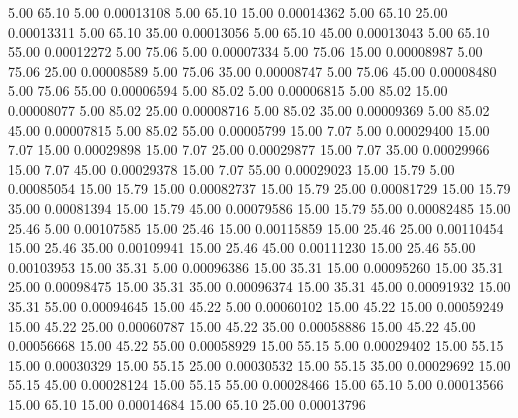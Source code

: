       5.00     65.10      5.00     0.00013108
      5.00     65.10     15.00     0.00014362
      5.00     65.10     25.00     0.00013311
      5.00     65.10     35.00     0.00013056
      5.00     65.10     45.00     0.00013043
      5.00     65.10     55.00     0.00012272
      5.00     75.06      5.00     0.00007334
      5.00     75.06     15.00     0.00008987
      5.00     75.06     25.00     0.00008589
      5.00     75.06     35.00     0.00008747
      5.00     75.06     45.00     0.00008480
      5.00     75.06     55.00     0.00006594
      5.00     85.02      5.00     0.00006815
      5.00     85.02     15.00     0.00008077
      5.00     85.02     25.00     0.00008716
      5.00     85.02     35.00     0.00009369
      5.00     85.02     45.00     0.00007815
      5.00     85.02     55.00     0.00005799
     15.00      7.07      5.00     0.00029400
     15.00      7.07     15.00     0.00029898
     15.00      7.07     25.00     0.00029877
     15.00      7.07     35.00     0.00029966
     15.00      7.07     45.00     0.00029378
     15.00      7.07     55.00     0.00029023
     15.00     15.79      5.00     0.00085054
     15.00     15.79     15.00     0.00082737
     15.00     15.79     25.00     0.00081729
     15.00     15.79     35.00     0.00081394
     15.00     15.79     45.00     0.00079586
     15.00     15.79     55.00     0.00082485
     15.00     25.46      5.00     0.00107585
     15.00     25.46     15.00     0.00115859
     15.00     25.46     25.00     0.00110454
     15.00     25.46     35.00     0.00109941
     15.00     25.46     45.00     0.00111230
     15.00     25.46     55.00     0.00103953
     15.00     35.31      5.00     0.00096386
     15.00     35.31     15.00     0.00095260
     15.00     35.31     25.00     0.00098475
     15.00     35.31     35.00     0.00096374
     15.00     35.31     45.00     0.00091932
     15.00     35.31     55.00     0.00094645
     15.00     45.22      5.00     0.00060102
     15.00     45.22     15.00     0.00059249
     15.00     45.22     25.00     0.00060787
     15.00     45.22     35.00     0.00058886
     15.00     45.22     45.00     0.00056668
     15.00     45.22     55.00     0.00058929
     15.00     55.15      5.00     0.00029402
     15.00     55.15     15.00     0.00030329
     15.00     55.15     25.00     0.00030532
     15.00     55.15     35.00     0.00029692
     15.00     55.15     45.00     0.00028124
     15.00     55.15     55.00     0.00028466
     15.00     65.10      5.00     0.00013566
     15.00     65.10     15.00     0.00014684
     15.00     65.10     25.00     0.00013796
